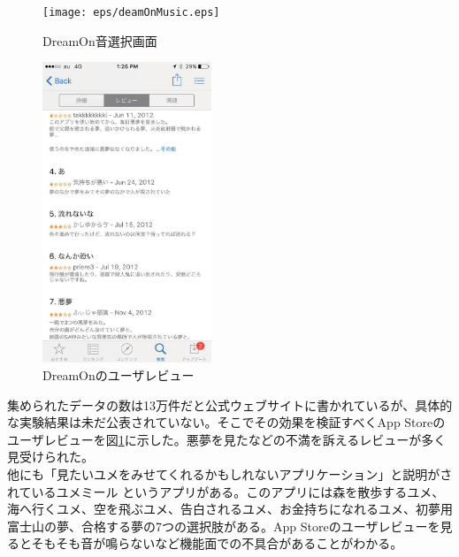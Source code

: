 \begin{figure}[htbp]
 \begin{minipage}{0.45\hsize}
  \begin{center}
   \texttt{[image: eps/deamOnMusic.eps]}
  \end{center}
  \caption{DreamOn音選択画面}
  \label{DreamOnMusicSlection}
 \end{minipage}
 \begin{minipage}{0.45\hsize}
  \begin{center}
   \includegraphics[height=90mm]{eps/dreamOn.eps}
  \end{center}
  \caption{DreamOnのユーザレビュー}
  \label{DreamOnImage}
 \end{minipage}
\end{figure}
集められたデータの数は13万件だと公式ウェブサイトに書かれているが、具体的な実験結果は未だ公表されていない。そこでその効果を検証すべくApp Storeのユーザレビューを図\ref{DreamOnImage}に示した。悪夢を見たなどの不満を訴えるレビューが多く見受けられた。\\
他にも「見たいユメをみせてくれるかもしれないアプリケーション」と説明がされているユメミール \cite{yumemiru}というアプリがある。このアプリには森を散歩するユメ、海へ行くユメ、空を飛ぶユメ、告白されるユメ、お金持ちになれるユメ、初夢用富士山の夢、合格する夢の7つの選択肢がある。App Storeのユーザレビューを見るとそもそも音が鳴らないなど機能面での不具合があることがわかる。
